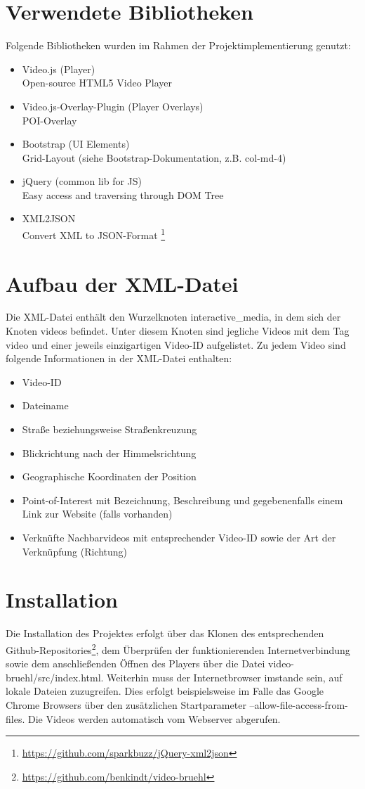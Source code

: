 \section{Verwendete Bibliotheken}
Folgende Bibliotheken wurden im Rahmen der Projektimplementierung genutzt:
\begin{itemize}
\item Video.js (Player) \\ Open-source HTML5 Video Player
\item Video.js-Overlay-Plugin (Player Overlays) \\ POI-Overlay
\item Bootstrap (UI Elements) \\ Grid-Layout (siehe Bootstrap-Dokumentation, z.B. col-md-4)
\item jQuery (common lib for JS) \\ Easy access and traversing through DOM Tree
\item XML2JSON \\ Convert XML to JSON-Format \footnote{\url{https://github.com/sparkbuzz/jQuery-xml2json}}
\end{itemize}
\pagebreak
\section{Aufbau der XML-Datei}
Die XML-Datei enthält den Wurzelknoten \glqq interactive\_media\grqq, in dem sich der Knoten \glqq videos\grqq{} befindet. Unter diesem Knoten sind jegliche Videos mit dem Tag \glqq video\grqq{} und einer jeweils einzigartigen Video-ID aufgelistet. Zu jedem Video sind folgende Informationen in der XML-Datei enthalten:
\begin{itemize}
\item Video-ID
\item Dateiname
\item Straße beziehungsweise Straßenkreuzung
\item Blickrichtung nach der Himmelsrichtung
\item Geographische Koordinaten der Position
\item Point-of-Interest mit Bezeichnung, Beschreibung und gegebenenfalls einem Link zur Website (falls vorhanden)
\item Verknüfte Nachbarvideos mit entsprechender Video-ID sowie der Art der Verknüpfung (Richtung)
\end{itemize}

\section{Installation}
Die Installation des Projektes erfolgt über das Klonen des entsprechenden Github-Repositories\footnote{\url{https://github.com/benkindt/video-bruehl}}, dem Überprüfen der funktionierenden Internetverbindung sowie dem anschließenden Öffnen des Players über die Datei \glqq video-bruehl/src/index.html\grqq. Weiterhin muss der Internetbrowser imstande sein, auf lokale Dateien zuzugreifen. Dies erfolgt beispielsweise im Falle das Google Chrome Browsers über den zusätzlichen Startparameter \glqq –allow-file-access-from-files\grqq. Die Videos werden automatisch vom Webserver abgerufen.



